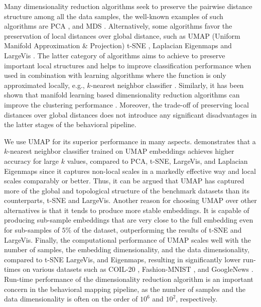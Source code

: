 Many dimensionality reduction algorithms seek to preserve the pairwise distance structure among all the data samples, the well-known examples of such algorithms are PCA \citep{hotelling_analysis_1933}, and MDS \citep{kruskal_multidimensional_1964}.
Alternatively, some algorithms favor the preservation of local distances over global distance, such as UMAP (Uniform Manifold Approximation \& Projection) \citep{mcinnes_umap_2020} t-SNE \citep{maaten_visualizing_2008}, Laplacian Eigenmaps \citep{belkin_laplacian_2003} and LargeVis \citep{tang_visualizing_2016}.
The latter category of algorithms aims to achieve to preserve important local structures and helps to improve classification performance when used in combination with learning algorithms where the function is only approximated locally, e.g., $k$-nearest neighbor classifier \citep{mcinnes_umap_2020}.
Similarly, it has been shown that manifold learning based dimensionality reduction algorithms can improve the clustering performance \citep{sainburg_parametric_2021}.
Moreover, the trade-off of preserving local distances over global distances does not introduce any significant disadvantages in the latter stages of the behavioral pipeline.

We use UMAP for its superior performance in many aspects.
\citet{mcinnes_umap_2020} demonstrates that a $k$-nearest neighbor classifier trained on UMAP embeddings achieves higher accuracy for large $k$ values, compared to PCA, t-SNE, LargeVis, and Laplacian Eigenmaps since it captures non-local scales in a markedly effective way and local scales comparably or better.
Thus, it can be argued that UMAP has captured more of the global and topological structure of the benchmark datasets than its counterparts, t-SNE and LargeVis.
Another reason for choosing UMAP over other alternatives is that it tends to produce more stable embeddings.
It is capable of producing sub-sample embeddings that are very close to the full embedding even for sub-samples of $5\%$ of the dataset, outperforming the results of t-SNE and LargeVis.
Finally, the computational performance of UMAP scales well with the number of samples, the embedding dimensionality, and the data dimensionality, compared to t-SNE LargeVis, and Eigenmaps, resulting in significantly lower run-times on various datasets such as  COIL-20 \citep{nene_columbia_1996}, Fashion-MNIST \citep{xiao_fashion-mnist_2017}, and GoogleNews \citep{mikolov_distributed_2013}.
Run-time performance of the dimensionality reduction algorithm is an important concern in the behavioral mapping pipeline, as the number of samples and the data dimensionality is often on the order of $10^6$ and $10^2$, respectively.

